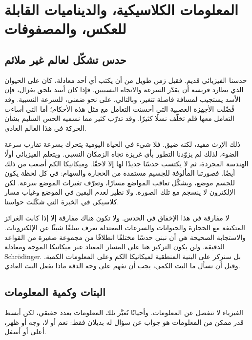 \chapter{المعلومات الكلاسيكية، والديناميات القابلة للعكس، والمصفوفات}


\section{حدس تشكّل لعالم غير ملائم}

حدسنا الفيزيائي قديم. فقبل زمن طويل من أن يكتب أي أحد معادلة، كان على الحيوان الذي يطارد فريسة أن يقدّر السرعة والاتجاه النسبيين. فإذا كان أسد يلحق بغزال، فإن الأسد يستجيب لمسافة فاصلة تتغير، وبالتالي، على نحو ضمني، للسرعة النسبية. وقد فُضّلت الأجهزة العصبية التي أحسنت التعامل مع مثل هذه الأحكام؛ أما التي أساءت التعامل معها فلم تخلّف نسلًا كثيرًا. وقد تدرّب كثير مما نسميه الحس السليم بشأن الحركة في هذا العالم العادي.

ذلك الإرث مفيد، لكنه ضيق. فلا شيء في الحياة اليومية يتحرك بسرعة تقارب سرعة الضوء، لذلك لم يزوّدنا التطور بأي غريزة تجاه الزمكان النسبي. ويتعلم الفيزيائي أولًا الهندسة المجردة، ثم لا يكتسب حدسًا جديدًا لها إلا لاحقًا. وميكانيكا الكم أصعب من ذلك أيضًا. فصورتنا المألوفة للجسيم مستمدة من الحجارة والسهام: في كل لحظة يكون للجسم موضع، ويشكّل تعاقب المواضع مسارًا، وتعرّف تغيرات الموضع سرعة. لكن الإلكترون لا ينسجم مع تلك الصورة. ولا نظير لعدم اليقين في الموضع وغياب مسار كلاسيكي في الخبرة التي شكّلت حواسنا.

لا مفارقة في هذا الإخفاق في الحدس. ولا تكون هناك مفارقة إلا إذا كانت الغرائز المتكيفة مع الحجارة والحيوانات والسرعات المعتدلة تعرف سلفًا شيئًا عن الإلكترونات. والاستجابة الصحيحة هي أن نبني حدسًا مختلفًا انطلاقًا من مجموعة صغيرة من القواعد الدقيقة. ولن يكون التركيز هنا على المسار المعتاد عبر ميكانيكا الموجة ومعادلة Schr\"odinger. بل سنركز على البنية المنطقية لميكانيكا الكم وعلى المعلومات الكمية. وقبل أن نسأل ما البت الكمي، يجب أن نفهم على وجه الدقة ماذا يفعل البت العادي.

\section{البتات وكمية المعلومات}

الفيزياء لا تنفصل عن المعلومات. وأحيانًا تُعبَّر تلك المعلومات بعدد حقيقي، لكن أبسط قدر ممكن من المعلومات هو جواب عن سؤال له بديلان فقط: نعم أو لا، وجه أو ظهر، أعلى أو أسفل.

